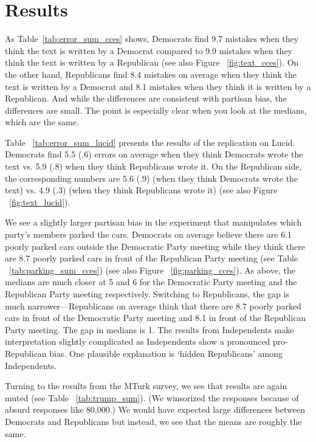 \documentclass[12pt, letterpaper]{article}
\begin{document}
\section{Results}

As Table~\ref{tab:error_sum_cces} shows, Democrats find 9.7 mistakes when they think the text is written by a Democrat compared to 9.9 mistakes when they think the text is written by a Republican (see also Figure ~\ref{fig:text_cces}). On the other hand, Republicans find 8.4 mistakes on average when they think the text is written by a Democrat and 8.1 mistakes when they think it is written by a Republican. And while the differences are consistent with partisan bias, the differences are small. The point is especially clear when you look at the medians, which are the same.



Table ~\ref{tab:error_sum_lucid} presents the results of the replication on Lucid. Democrats find 5.5 (.6) errors on average when they think Democrats wrote the text vs. 5.9 (.8) when they think Republicans wrote it. On the Republican side, the corresponding numbers are 5.6 (.9) (when they think Democrats wrote the text) vs. 4.9 (.3) (when they think Republicans wrote it) (see also Figure ~\ref{fig:text_lucid}).



We see a slightly larger partisan bias in the experiment that manipulates which party's members parked the cars. Democrats on average believe there are 6.1 poorly parked cars outside the Democratic Party meeting while they think there are 8.7 poorly parked cars in front of the Republican Party meeting (see Table ~\ref{tab:parking_sum_cces}) (see also Figure ~\ref{fig:parking_cces}). As above, the medians are much closer at 5 and 6 for the Democratic Party meeting and the Republican Party meeting respectively. Switching to Republicans, the gap is much narrower---Republicans on average think that there are 8.7 poorly parked cars in front of the Democratic Party meeting and 8.1 in front of the Republican Party meeting. The gap in medians is 1. The results from Independents make interpretation slightly complicated as Independents show a pronounced pro-Republican bias. One plausible explanation is `hidden Republicans' among Independents.



Turning to the results from the MTurk survey, we see that results are again muted (see Table ~\ref{tab:trump_sum}). (We winsorized the responses because of absurd responses like 80,000.) We would have expected large differences between Democrats and Republicans but instead, we see that the means are roughly the same.
\end{document}
